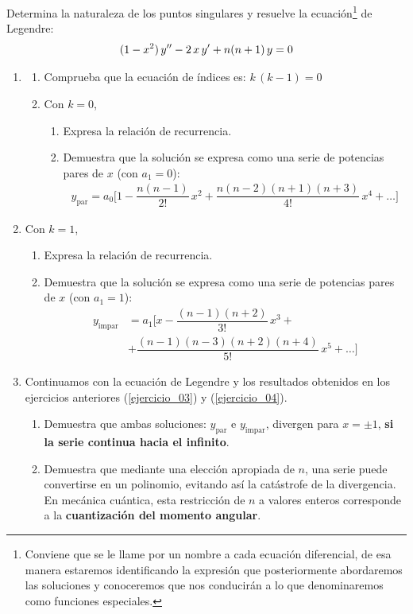 Determina la naturaleza de los puntos singulares y resuelve la ecuación\footnote{Conviene que se le llame por un nombre a cada ecuación diferencial, de esa manera estaremos identificando la expresión que posteriormente abordaremos las soluciones y conoceremos que nos conducirán a lo que denominaremos como funciones especiales.} de Legendre:
\begin{align*}
(1 -x^{2}) \, {y}^{\prime \prime} -  2 \, x \, {y}^{\prime} + n(n + 1) \, y = 0
\end{align*}
\begin{enumerate}[resume]
\item \label{ejercicio_03} \begin{enumerate}[label=\roman*)]
\item Comprueba que la ecuación de índices es: $k \, (k - 1) = 0$
\item Con $k = 0$, 
\begin{enumerate}[label=\alph*)]
\item Expresa la relación de recurrencia.
\item Demuestra que la solución se expresa como una serie de potencias pares de $x$ (con $a_{1} = 0$):
\begin{align*}
y_{\mbox{par}} = a_{0} \bigg[ 1 - \dfrac{n (n - 1)}{2!} \, x^{2} + \dfrac{n (n - 2)(n + 1)(n + 3)}{4!} \, x^{4} + \ldots \bigg]
\end{align*}
\end{enumerate}
\end{enumerate}
\item \label{ejercicio_04} Con $k = 1$, 
\begin{enumerate}[label=\alph*)]
\item Expresa la relación de recurrencia.
\item Demuestra que la solución se expresa como una serie de potencias pares de $x$ (con $a_{1} = 1$):
\begin{align*}
y_{\mbox{impar}} &= a_{1} \bigg[ x - \dfrac{(n - 1)(n + 2)}{3!} \, x^{3} + \\[0.5em] 
&+ \dfrac{(n - 1)(n - 3)(n + 2)(n + 4)}{5!} \, x^{5} + \ldots \bigg]
\end{align*}
\end{enumerate}
\newpage
\item Continuamos con la ecuación de Legendre y los resultados obtenidos en los ejercicios anteriores (\ref{ejercicio_03}) y (\ref{ejercicio_04}).
\begin{enumerate}[label=\roman*)]
\item Demuestra que ambas soluciones: $y_{\mbox{par}}$ e $y_{\mbox{impar}}$, divergen para \break \hfill $x = \pm 1$, \textbf{si la serie continua hacia el infinito}.
\item Demuestra que mediante una elección apropiada de $n$, una serie puede convertirse en un polinomio, evitando así la catástrofe de la divergencia. En mecánica cuántica, esta restricción de $n$ a valores enteros corresponde a la \textbf{cuantización del momento angular}.
\end{enumerate}


\end{enumerate}
